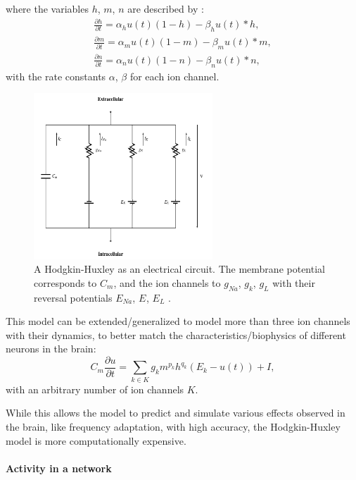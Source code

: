 where the variables $h$, $m$, $n$  are described by :
\[
\begin{split}
	\frac{\partial h}{\partial t} = \alpha_h u(t) (1-h) - \beta_h u(t) * h , \\
	\frac{\partial m}{\partial t} = \alpha_m u(t) (1-m) - \beta_m u(t) * m , \\
	\frac{\partial n}{\partial t} = \alpha_n u(t) (1-n) - \beta_n u(t) * n ,
\end{split}
\]
with the rate constants $\alpha$, $\beta$ for each ion channel.

\begin{figure}
	\centering
    	\includegraphics[width=0.6\textwidth]{imgs/hode_hux.png} 
    \caption{A Hodgkin-Huxley as an electrical circuit. The membrane potential corresponds to $C_m$, and the ion channels to $g_{Na}$, $g_{k}$, $g_{L}$ with their reversal potentials $E_{Na}$, $E_{}$, $E_{L}$ \cite{heikoMA}.}
	\label{fig:hogdehux}
\end{figure}

This model can be extended/generalized to model more than three ion channels with their dynamics, to better match the characteristics/biophysics of different neurons in the brain:
\[
C_m \frac{\partial u}{\partial t} = \sum_{k \in K} g_k m^{p_k} h^{q_k} (E_k - u(t)) + I,
\]
with an arbitrary number of ion channels $K$.

While this allows the model to predict and simulate various effects observed in the brain, like frequency adaptation, with high accuracy, the Hodgkin-Huxley model is more computationally expensive.

\paragraph{Activity in a network}

